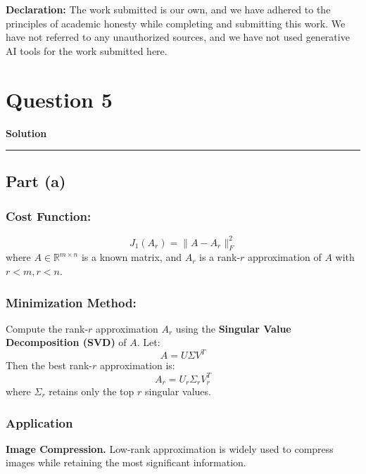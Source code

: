 \documentclass[a4paper,12pt]{article}
\title{\cooltitle{CS754 Assignment-5}}
\author{{\bf Saksham Rathi, Ekansh Ravi Shankar, Kshitij Vaidya}}
\date{}
\newenvironment{solution}[2][]{%
    \begin{mdframed}[linecolor=blue!70!black, linewidth=2pt, roundcorner=10pt, backgroundcolor=yellow!10!white, skipabove=12pt, skipbelow=12pt]%
        \textbf{\large #2}
        \par\noindent\rule{\textwidth}{0.4pt}
}{
    \end{mdframed}
}
\begin{document}
\maketitle
\textbf{Declaration:} The work submitted is our own, and
we have adhered to the principles of academic honesty while completing and submitting this work. We have not referred to any unauthorized sources, and we have not used generative AI tools for the work submitted here.

\section*{Question 5}

\begin{solution}{Solution}

\subsection{Part (a)}

\subsubsection{Cost Function:}
\begin{equation}
J_1(A_r) = \|A - A_r\|_F^2
\end{equation}
where \( A \in \mathbb{R}^{m \times n} \) is a known matrix, and \( A_r \) is a rank-\( r \) approximation of \( A \) with \( r < m, r < n \).

\subsubsection{Minimization Method:}  
Compute the rank-\( r \) approximation \( A_r \) using the \textbf{Singular Value Decomposition (SVD)} of \( A \). Let:
\begin{equation}
A = U \Sigma V^T
\end{equation}
Then the best rank-\( r \) approximation is:
\begin{equation}
A_r = U_r \Sigma_r V_r^T
\end{equation}
where \( \Sigma_r \) retains only the top \( r \) singular values.

\subsubsection{Application}  
\textbf{Image Compression.} Low-rank approximation is widely used to compress images while retaining the most significant information.


\end{solution}
\end{document}

